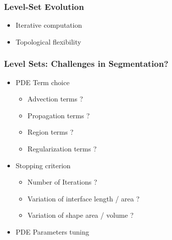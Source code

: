 \begin{frame}
\frametitle{Level-Set Evolution}
\begin{itemize}
  \item Iterative computation
  \item Topological flexibility
\end{itemize}
\end{frame}



\begin{frame}
\frametitle{Level Sets: Challenges in Segmentation?}
\begin{itemize}
  \item PDE Term choice
    \begin{itemize}
      \item Advection terms ?
      \item Propagation terms ?
      \item Region terms ?
      \item Regularization terms ?
    \end{itemize}
  \item<2-> Stopping criterion
    \begin{itemize}
      \item Number of Iterations ?
      \item Variation of interface length / area ?
      \item Variation of shape area / volume ?
    \end{itemize}
  \item<3-> PDE Parameters tuning
\end{itemize}
\end{frame}




